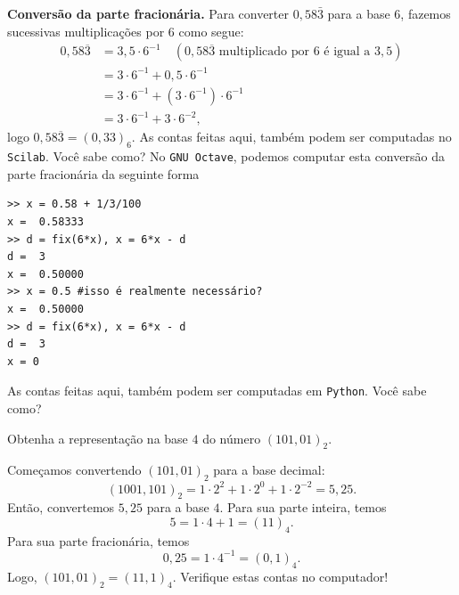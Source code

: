 \begin{resol}
{\bf Conversão da parte fracionária.} Para converter $0,58\bar{3}$ para a base $6$, fazemos sucessivas multiplicações por $6$ como segue:
  \begin{equation}
    \begin{split}
    0,58\overline{3} &= 3,5\cdot 6^{-1}\quad(\mbox{$0,58\overline{3}$ multiplicado por $6$ é igual a $3,5$})\\
    &= 3\cdot 6^{-1} + 0,5\cdot 6^{-1}\\
    &= 3\cdot 6^{-1} + (3\cdot 6^{-1})\cdot 6^{-1}\\
    &= 3\cdot 6^{-1} + 3\cdot 6^{-2},
    \end{split}
  \end{equation}
logo $0,58\overline{3} = (0,33)_6$.
\ifisscilab
As contas feitas aqui, também podem ser computadas no \verb+Scilab+. Você sabe como?
\fi
\ifisoctave
No \verb+GNU Octave+, podemos computar esta conversão da parte fracionária da seguinte forma
\begin{verbatim}
>> x = 0.58 + 1/3/100
x =  0.58333
>> d = fix(6*x), x = 6*x - d
d =  3
x =  0.50000
>> x = 0.5 #isso é realmente necessário?
x =  0.50000
>> d = fix(6*x), x = 6*x - d
d =  3
x = 0
\end{verbatim}
\fi
\ifispython
As contas feitas aqui, também podem ser computadas em \verb+Python+. Você sabe como?
\fi
\end{resol}

\begin{exeresol}
  Obtenha a representação na base $4$ do número $(101,01)_2$.
\end{exeresol}
\begin{resol}
  Começamos convertendo $(101,01)_2$ para a base decimal:
  \begin{equation}
    (1001,101)_2 = 1\cdot 2^2 + 1\cdot 2^0 + 1\cdot 2^{-2} = 5,25.
  \end{equation}
Então, convertemos $5,25$ para a base $4$. Para sua parte inteira, temos
\begin{equation}
  5 = 1\cdot 4 + 1 = (11)_4.
\end{equation}
Para sua parte fracionária, temos
\begin{equation}
  0,25 = 1\cdot 4^{-1} = (0,1)_4.
\end{equation}
Logo, $(101,01)_2 = (11,1)_4$. Verifique estas contas no computador!
\end{resol}

